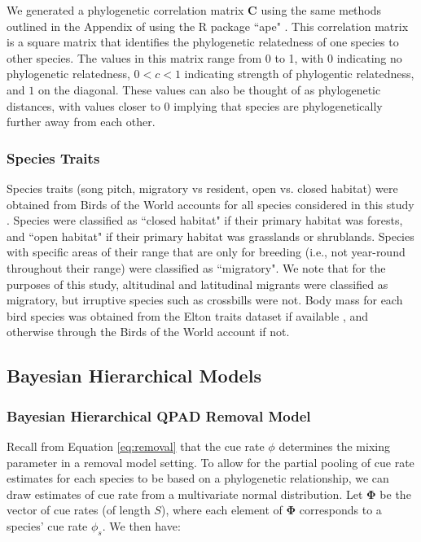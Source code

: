 \documentclass[12pt]{article}
\begin{document}
\par We generated a phylogenetic correlation matrix $\mathbf{C}$ using the same methods outlined in the Appendix of \citet{solymos_phylogeny_2018} using the R package ``ape" \citep{paradis_ape_2019}. 
This correlation matrix is a square matrix that identifies the phylogenetic relatedness of one species to other species.
The values in this matrix range from 0 to 1, with 0 indicating no phylogenetic relatedness, $0 < c < 1$ indicating strength of phylogentic relatedness, and $1$ on the diagonal.
These values can also be thought of as phylogenetic distances, with values closer to 0 implying that species are phylogenetically further away from each other.

\subsubsection{Species Traits}
\par Species traits (song pitch, migratory vs resident, open vs. closed habitat) were obtained from Birds of the World accounts for all species considered in this study \citep{billerman_birds_2022}. 
Species were classified as ``closed habitat" if their primary habitat was forests, and ``open habitat" if their primary habitat was grasslands or shrublands.
Species with specific areas of their range that are only for breeding (i.e., not year-round throughout their range) were classified as ``migratory".
We note that for the purposes of this study, altitudinal and latitudinal migrants were classified as migratory, but irruptive species such as crossbills were not.
Body mass for each bird species was obtained from the Elton traits dataset if available \citep{wilman_eltontraits_2014}, and otherwise through the Birds of the World account \citep{billerman_birds_2022} if not.

\subsection{Bayesian Hierarchical Models}

\subsubsection{Bayesian Hierarchical QPAD Removal Model}\label{section-removal-models}
 
\par Recall from Equation \ref{eq:removal} that the cue rate $\phi$ determines the mixing parameter in a removal model setting.
To allow for the partial pooling of cue rate estimates for each species to be based on a phylogenetic relationship, we can draw estimates of cue rate from a multivariate normal distribution. 
Let $\mathbf{\Phi}$ be the vector of cue rates (of length $S$), where each element of $\mathbf{\Phi}$ corresponds to a species' cue rate $\phi_s$.
We then have:
\end{document}
